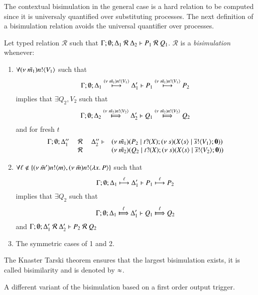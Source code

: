 The contextual bisimulation in the general case is a hard relation to be computed
since it is universaly quantified over substituting processes. The next definition
of a bisimulation relation avoids the universal quantifier over processes.


\begin{definition}[Bisimulation]\rm
	\label{d:bisim}
	Let typed relation $\mathcal{R}$ such that
	$\horel{\Gamma}{\Delta_1}{P_1}{\ \mathcal{R}\ }{\Delta_2}{Q_1}$.
	$\mathcal{R}$ is a {\em bisimulation} whenever:
	\begin{enumerate}
		\item	$\forall \news{\tilde{m_1}} \bactout{n}{V_1}$ such that
			\[
				\horel{\Gamma}{\Delta_1}{P_1}{\hby{\news{\tilde{m_1}} \bactout{n}{V_1}}}{\Delta_1'}{P_2}
			\]
			implies that $\exists Q_2, V_2$ such that
			\[
				\horel{\Gamma}{\Delta_2}{Q_1}{\Hby{\news{\tilde{m_2}} \bactout{n}{V_2}}}{\Delta_2'}{Q_2}
			\]
			and for fresh $t$
			\[
				\mhorel{\Gamma}{\Delta_1''}{\newsp{\tilde{m_1}}{P_2 \Par \hotrigger{t}{V_1}}}
				{\ \mathcal{R}\ }
				{\Delta_2''}{}{\newsp{\tilde{m_2}}{Q_2 \Par \hotrigger{t}{V_2}}}
			\]

		\item	$\forall \ell \notin \set{\news{\tilde{m}'} \bactout{n}{m}, \news{\tilde{m}} \bactout{n}{\abs{x}{P}}}$ such that
			\[
				\horel{\Gamma}{\Delta_1}{P_1}{\hby{\ell}}{\Delta_1'}{P_2}
			\]
			implies that $\exists Q_2$ such that 
			\[
				\horel{\Gamma}{\Delta_1}{Q_1}{\Hby{\ell}}{\Delta_1'}{Q_2}
			\]
			and
			$\horel{\Gamma}{\Delta_1'}{P_2}{\ \mathcal{R}\ }{\Delta_2'}{Q_2}$

		\item	The symmetric cases of 1 and 2.
	\end{enumerate}
	The Knaster Tarski theorem ensures that the largest bisimulation exists,
	it is called bisimilarity and is denoted by $\wb$.
\end{definition}


A different variant of the bisimulation based on a first order
output trigger.

